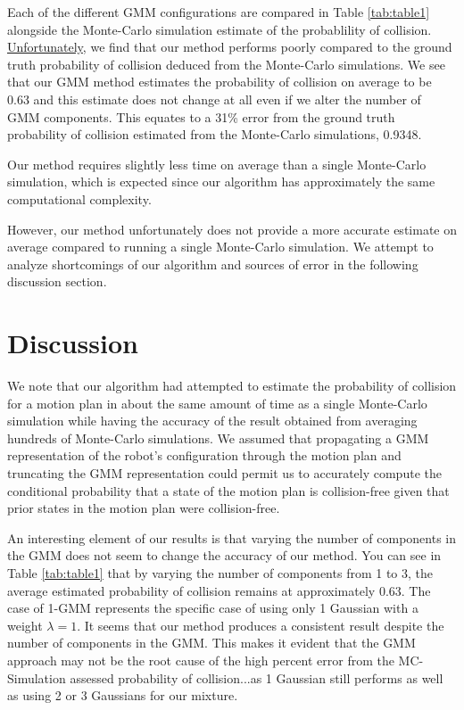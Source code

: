\documentclass[journal]{IEEEtran}
\begin{document}
Each of the different GMM configurations are compared in Table \ref{tab:table1} alongside the Monte-Carlo simulation estimate of the probablility of collision. \underline{Unfortunately}, we find that our method performs poorly compared to the ground truth probability of collision deduced from the Monte-Carlo simulations. We see that our GMM method estimates the probability of collision on average to be 0.63 and this estimate does not change at all even if we alter the number of GMM components. This equates to a 31\% error from the ground truth probability of collision estimated from the Monte-Carlo simulations, 0.9348.

Our method requires slightly less time on average than a single Monte-Carlo simulation, which is expected since our algorithm has approximately the same computational complexity.

However, our method unfortunately does not provide a more accurate estimate on average compared to running a single Monte-Carlo simulation. We attempt to analyze shortcomings of our algorithm and sources of error in the following discussion section.

\section{Discussion}
We note that our algorithm had attempted to estimate the probability of collision for a motion plan in about the same amount of time as a single Monte-Carlo simulation while having the accuracy of the result obtained from averaging hundreds of Monte-Carlo simulations. We assumed that propagating a GMM representation of the robot's configuration through the motion plan and truncating the GMM representation could permit us to accurately compute the conditional probability that a state of the motion plan is collision-free given that prior states in the motion plan were collision-free.

An interesting element of our results is that varying the number of components in the GMM does not seem to change the accuracy of our method. You can see in Table \ref{tab:table1} that by varying the number of components from 1 to 3, the average estimated probability of collision remains at approximately 0.63. The case of 1-GMM represents the specific case of using only 1 Gaussian with a weight $\lambda=1$. It seems that our method produces a consistent result despite the number of components in the GMM. This makes it evident that the GMM approach may not be the root cause of the high percent error from the MC-Simulation assessed probability of collision...as 1 Gaussian still performs as well as using 2 or 3 Gaussians for our mixture.
\end{document}
